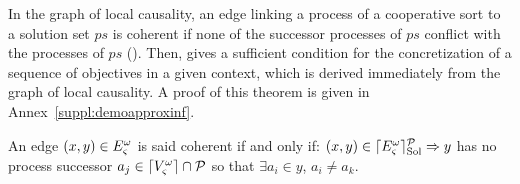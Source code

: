 \begin{comment}
\begin{definition}
  \label{def:aS}
  The abstract structure $\cwB=(\Breq,\Bsol,\Brsp,\Bcont)$ is defined as
  $\cwB = \sfp{\aB^\w_\ctx}{\myB}{\aB^\w_{\ctx \Cap \allprocs_\ctx(\myB)}}$,\\
  with $\myB=(\myreq,\mysol,\myrsp,\mycont)$:
  \begin{align*}
    \myreq &= \{ (a_i,\PHobjp{a}{j}{i}) \in \PHproc \times \Obj \mid
      a \in \components \wedge a_j \in \PHget{\ctx}{a} \\ %
      & \qquad \wedge ((\exists (P,ps) \in \mysol \vee \exists (b_j, ps) \in \myrsp), a_i \in ps \\
      & \qquad\qquad \vee \exists n \in \indexes{\w}, \PHbounce(\w_n)=a_i) \}
    \\
    \mysol &\subseteq \{ (P,ps) \in \Obj \times \powerset(\PHproc) \mid
            \exists (a_i, P) \in \myreq \wedge ps \in \aBS(P) \\
      & \qquad\qquad \vee \exists (Q, P) \in \mycont \wedge ps \in \aBS(P) \}
    \\
    \myrsp &= \{ (a_i,ps) \in \PHproc \times \powerset(\PHproc) \mid a \in \cs \\
      & \qquad \wedge (\exists (P,ps') \in \mysol \vee \exists (b_j,ps') \in \myrsp), \\
      & \qquad\qquad a_i \in ps' \wedge \csState(a_i) \in ps \}
    \\
    \mycont & = \{ (P, \PHobj{q}{\PHbounce(P)}) \in \Obj \times \Obj \mid
      \exists (P, ps) \in \mysol \\
      & \qquad\qquad \wedge q \in \gCont_\ctx(\PHsort(P),P) \}
  \end{align*}
\end{definition}

\begin{definition}[Coherent solution]
\label{def:coherent}
  A cooperative sort requisite $(a_i, ps)$ in $\Brsp$ is said coherent iff
  it has no successor $(b_k,\PHobjp{b}{j}{k})$ in $\Breq$ so that there exists $b_n \in ps$, $b_k \neq b_n$.
\end{definition}
\end{comment}
%
In the graph of local causality, an edge linking a process of a cooperative sort to a solution set $ps$ is coherent if none of the successor processes of $ps$ conflict with the processes of $ps$ ().
Then,  gives a sufficient condition for the concretization of a sequence of objectives in a given context,
which is derived immediately from the graph of local causality.
A proof of this theorem is given in Annex~\ref{suppl:demoapproxinf}.
\begin{definition}
\label{def:coherent}
  An edge $(x, y) \in E_\varsigma^\omega$ is said coherent if and only if:
  $(x, y) \in \lceil E_\varsigma^\omega\rceil^{\mathcal{P}}_{\mathrm{Sol}} \Rightarrow y$ has no process successor $a_j \in \lceil V_\varsigma^\omega\rceil \cap \mathcal{P}$ so that $\exists a_i \in y$, $a_i \neq a_k$.
\end{definition}

